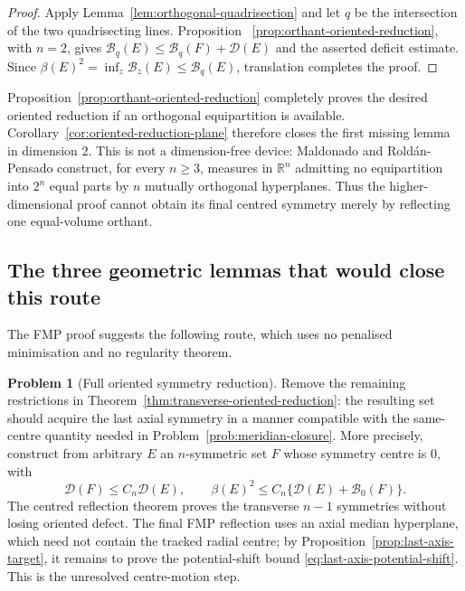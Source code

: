 \documentclass[11pt]{amsart}
\theoremstyle{definition}
\newtheorem{problem}[theorem]{Problem}
\newcommand{\R}{\mathbb R}
\newcommand{\Def}{\mathcal D}
\begin{document}
\begin{proof}
Apply Lemma~\ref{lem:orthogonal-quadrisection} and let \(q\) be the
intersection of the two quadrisecting lines.  Proposition
~\ref{prop:orthant-oriented-reduction}, with \(n=2\), gives
\(\mathcal B_q(E)\le\mathcal B_q(F)+\Def(E)\) and the asserted
deficit estimate.  Since
\(\beta(E)^2=\inf_z\mathcal B_z(E)\le\mathcal B_q(E)\), translation
completes the proof.
\end{proof}

Proposition~\ref{prop:orthant-oriented-reduction} completely proves
the desired oriented reduction if an orthogonal equipartition is
available.  Corollary~\ref{cor:oriented-reduction-plane}
therefore closes the first missing lemma in dimension \(2\).  This is
not a dimension-free device:
Maldonado and Rold\'an-Pensado \cite{MaldonadoRoldan} construct, for
every \(n\ge3\), measures in \(\R^n\) admitting no equipartition into
\(2^n\) equal parts by \(n\) mutually orthogonal hyperplanes.  Thus
the higher-dimensional proof cannot obtain its final centred symmetry
merely by reflecting one equal-volume orthant.

\subsection{The three geometric lemmas that would close this route}

The FMP proof suggests the following route, which uses no penalised
minimisation and no regularity theorem.

\begin{problem}[Full oriented symmetry reduction]\label{prob:oriented-reduction}
Remove the remaining restrictions in
Theorem~\ref{thm:transverse-oriented-reduction}: the resulting set
should acquire the last axial symmetry in a manner compatible with
the same-centre quantity needed
in Problem~\ref{prob:meridian-closure}.  More precisely, construct from arbitrary \(E\) an
\(n\)-symmetric set \(F\) whose symmetry centre is \(0\), with
\[
   \Def(F)\le C_n\Def(E),
   \qquad
   \beta(E)^2\le C_n\bigl\{\Def(E)+\mathcal B_0(F)\bigr\}.
\tag{6.7}\label{eq:oriented-reduction-target}
\]
The centred reflection theorem proves the transverse \(n-1\)
symmetries without losing oriented defect.  The final FMP reflection
uses an axial median hyperplane, which need not contain the tracked
radial centre; by Proposition~\ref{prop:last-axis-target}, it remains
to prove the potential-shift bound
\eqref{eq:last-axis-potential-shift}.  This is the unresolved
centre-motion step.
\end{problem}
\end{document}
